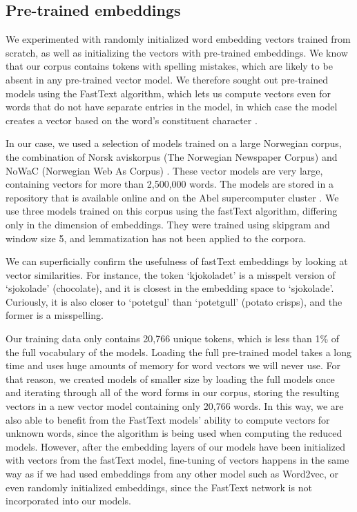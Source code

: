 \subsection{Pre-trained embeddings}

We experimented with randomly initialized word embedding vectors trained from
scratch, as well as initializing the vectors with pre-trained embeddings. We
know that our corpus contains tokens with spelling mistakes, which are likely
to be absent in any pre-trained vector model. We therefore sought out
pre-trained models using the FastText algorithm, which lets us compute
vectors even for words that do not have separate entries in the model, in
which case the model creates a vector based on the word's constituent
character \ngrams.

In our case, we used a selection of models trained on a large Norwegian
corpus, the combination of Norsk aviskorpus (The Norwegian Newspaper Corpus)
and NoWaC (Norwegian Web As Corpus) \autocite{stadsnes2018}. These vector
models are very large, containing vectors for more than 2,500,000 words. The
models are stored in a repository that is available online and on the Abel
supercomputer cluster \autocite{murhaf2017repository}. We use three models
trained on this corpus using the fastText algorithm, differing only in the
dimension of embeddings. They were trained using skipgram and window size 5, 
and lemmatization has not been applied to the corpora.

We can superficially confirm the usefulness of fastText embeddings by looking
at vector similarities. For instance, the token `kjokoladet' is a misspelt
version of `sjokolade' (chocolate), and it is closest in the embedding space
to `sjokolade'. Curiously, it is also closer to `potetgul' than `potetgull'
(potato crisps), and the former is a misspelling.

Our training data only contains 20,766 unique tokens, which is less than 1\%
of the full vocabulary of the models. Loading the full pre-trained model
takes a long time and uses huge amounts of memory for word vectors we will
never use. For that reason, we created models of smaller size by loading the
full models once and iterating through all of the word forms in our corpus,
storing the resulting vectors in a new vector model containing only 20,766
words. In this way, we are also able to benefit from the FastText models'
ability to compute vectors for unknown words, since the \ngram algorithm is
being used when computing the reduced models. However, after the embedding
layers of our models have been initialized with vectors from the fastText
model, fine-tuning of vectors happens in the same way as if we had used
embeddings from any other model such as Word2vec, or even randomly
initialized embeddings, since the FastText network is not incorporated into
our models.


